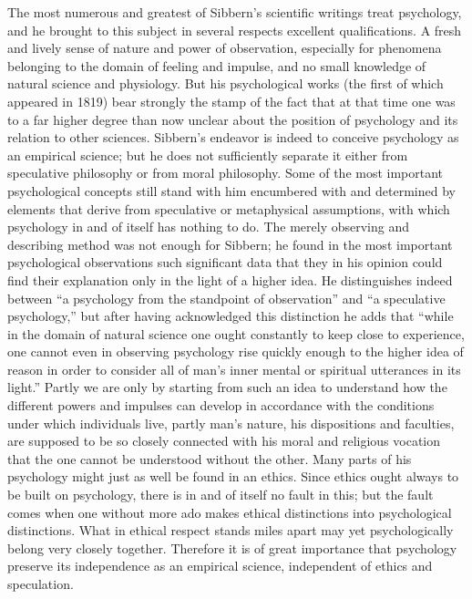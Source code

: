 \documentclass[12pt,a4paper,openany]{book}
\newcommand{\opage}[1]{\marginnote{\footnotesize\textit{[#1]}}}
\begin{document}
The most numerous and greatest of Sibbern's scientific writings
treat psychology, and he brought to this subject in several
respects excellent qualifications. A fresh and lively
sense of nature and power of observation, especially for phenomena belonging
to the domain of feeling and impulse, and no small
knowledge of natural science and physiology. But his
psychological works (the first of which appeared in 1819) bear
strongly the stamp of the fact that at that time one was to a far higher degree than
\opage{76}now unclear about the position of psychology and its relation to other
sciences. Sibbern's endeavor is indeed to
conceive psychology as an empirical science; but he
does not sufficiently separate it either from speculative
philosophy or from moral philosophy. Some of the most important
psychological concepts still stand with him encumbered with and
determined by elements that derive from speculative or
metaphysical assumptions, with which psychology in and of itself
has nothing to do. The merely observing and describing
method was not enough for Sibbern; he found in the most important
psychological observations such significant data that they
in his opinion could find their explanation only in the light
of a higher idea. He distinguishes indeed between ``a psychology
from the standpoint of observation'' and ``a speculative psychology,''
but after having acknowledged this distinction he adds that
``while in the domain of natural science one ought constantly to
keep close to experience, one cannot even in observing
psychology rise quickly enough to the higher
idea of reason in order to consider all of man's inner mental
or spiritual utterances in its light.'' Partly we are only
by starting from such an idea to understand how the
different powers and impulses can develop in accordance
with the conditions under which individuals live, partly
man's nature, his dispositions and faculties, are supposed to be so closely connected
with his moral and religious vocation that the
one cannot be understood without the other. Many parts of
his psychology might just as well be found in an ethics. Since
ethics ought always to be built on psychology, there is in and of
itself no fault in this; but the fault comes when one without
more ado makes ethical distinctions into psychological distinctions.
What in ethical respect stands miles apart may
yet psychologically belong very closely together. Therefore it is
of great importance that psychology preserve its
independence as an empirical science, independent of ethics and
speculation.
\end{document}
